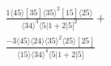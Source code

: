 \documentclass[varwidth, border=5pt]{standalone}
\begin{document}
\begin{my}
$\begin{gathered}
\scriptscriptstyle\frac{1⟨45⟩[35]⟨35⟩^2[15]⟨25⟩}{⟨34⟩^3⟨5|1+2|5]^2}+\\
\scriptscriptstyle\frac{-3⟨45⟩⟨24⟩⟨35⟩^2⟨25⟩[25]}{⟨15⟩⟨34⟩^4⟨5|1+2|5]}\phantom{+}
\end{gathered}$
\end{my}
\end{document}
